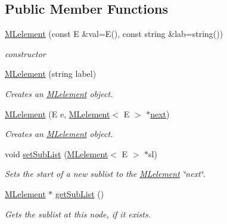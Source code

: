 \subsection*{Public Member Functions}
\begin{DoxyCompactItemize}
\item 
\hyperlink{classbridges_1_1datastructure_1_1_m_lelement_af73050e460a47d0b5d82ee6ae49b6c59}{M\+Lelement} (const E \&val=E(), const string \&lab=string())
\begin{DoxyCompactList}\small\item\em constructor \end{DoxyCompactList}\item 
\hyperlink{classbridges_1_1datastructure_1_1_m_lelement_aae22c04d644bcab2eba56bb8dc84d5eb}{M\+Lelement} (string label)
\begin{DoxyCompactList}\small\item\em Creates an \hyperlink{classbridges_1_1datastructure_1_1_m_lelement}{M\+Lelement} object. \end{DoxyCompactList}\item 
\hyperlink{classbridges_1_1datastructure_1_1_m_lelement_ac3349ecdbce79646839cdb9ea1e90b2f}{M\+Lelement} (E e, \hyperlink{classbridges_1_1datastructure_1_1_m_lelement}{M\+Lelement}$<$ E $>$ $\ast$\hyperlink{classbridges_1_1datastructure_1_1_s_lelement_afc016a593a4a5aba82021ee34edadbfc}{next})
\begin{DoxyCompactList}\small\item\em Creates an \hyperlink{classbridges_1_1datastructure_1_1_m_lelement}{M\+Lelement} object. \end{DoxyCompactList}\item 
void \hyperlink{classbridges_1_1datastructure_1_1_m_lelement_a5d6a2fa775c819c8c7609b539c93fe9f}{set\+Sub\+List} (\hyperlink{classbridges_1_1datastructure_1_1_m_lelement}{M\+Lelement}$<$ E $>$ $\ast$sl)
\begin{DoxyCompactList}\small\item\em Sets the start of a new sublist to the \hyperlink{classbridges_1_1datastructure_1_1_m_lelement}{M\+Lelement} \char`\"{}next\char`\"{}. \end{DoxyCompactList}\item 
\hyperlink{classbridges_1_1datastructure_1_1_m_lelement}{M\+Lelement} $\ast$ \hyperlink{classbridges_1_1datastructure_1_1_m_lelement_a9faeb30ffd023746ce36e05705a62b2d}{get\+Sub\+List} ()
\begin{DoxyCompactList}\small\item\em Gets the sublist at this node, if it exists. \end{DoxyCompactList}\item 

\end{DoxyCompactItemize}
